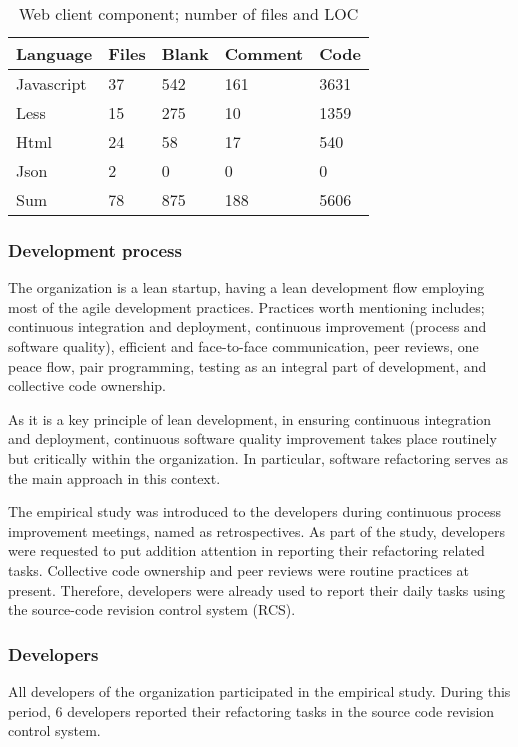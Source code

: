 \documentclass[english,12pt,a4paper,pdftex,sci,utf8]{aaltothesis}
\begin{document}
\begin{table}[ht!]
\centering
\caption{Web client component; number of files and LOC}
\label{table:webLoc}
    \begin{tabular}{ |p{3cm} p{2cm} p{2cm} p{2cm} p{2cm}|  }
     \hline
     Language&Files&Blank&Comment&Code\\
     \hline\hline
     Javascript   & 37    &542&   161&3631\\
     Less&   15  & 275   &10 & 1359\\
     Html &24 & 58&  17&540\\
     Json    &2 & 0&  0 & 0\\
     \hline\hline
     Sum&78&875&188&5606\\
     \hline
    \end{tabular}
\end{table}
\subsubsection*{Development process} \label{process}
The organization is a lean startup, having a lean development flow employing most of the agile development practices. Practices worth mentioning includes; continuous integration and deployment, continuous improvement (process and software quality), efficient and face-to-face communication, peer reviews, one peace flow, pair programming, testing as an integral part of development, and collective code ownership.

As it is a key principle of lean development, in ensuring continuous integration and deployment, continuous software quality improvement takes place routinely but critically within the organization. In particular, software refactoring serves as the main approach in this context.  

The empirical study was introduced to the developers during continuous process improvement meetings, named as retrospectives. As part of the study, developers were requested to put addition attention in reporting their refactoring related tasks. Collective code ownership and peer reviews were routine practices at present. Therefore, developers were already used to report their daily tasks using the source-code revision control system (RCS). 

\subsubsection*{Developers} \label{developers}
All developers of the organization participated in the empirical study. During this period, 6 developers reported their refactoring tasks in the source code revision control system.
\end{document}
